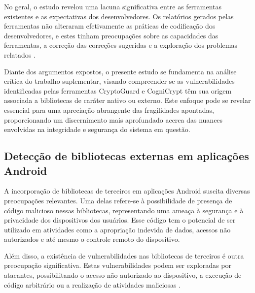 No geral, o estudo revelou uma lacuna significativa entre as ferramentas existentes e as expectativas dos desenvolvedores. Os relatórios gerados pelas ferramentas não alteraram efetivamente as práticas de codificação dos desenvolvedores, e estes tinham preocupações sobre as capacidades das ferramentas, a correção das correções sugeridas e a exploração dos problemas relatados \cite{api_misuses_zhang}.


Diante dos argumentos expostos, o presente estudo se fundamenta na análise crítica do trabalho suplementar, visando compreender se as vulnerabilidades identificadas pelas ferramentas CryptoGuard e CogniCrypt têm sua origem associada a bibliotecas de caráter nativo ou externo. Este enfoque pode se revelar essencial para uma apreciação abrangente das fragilidades apontadas, proporcionando um discernimento mais aprofundado acerca das nuances envolvidas na integridade e segurança do sistema em questão.

\subsection{Detecção de bibliotecas externas em aplicações Android} %

A incorporação de bibliotecas de terceiros em aplicações Android suscita diversas preocupações relevantes. Uma delas refere-se à possibilidade de presença de código malicioso nessas bibliotecas, representando uma ameaça à segurança e à privacidade dos dispositivos dos usuários. Esse código tem o potencial de ser utilizado em atividades como a apropriação indevida de dados, acessos não autorizados e até mesmo o controle remoto do dispositivo. \cite{api_tpl_zhang}

Além disso, a existência de vulnerabilidades nas bibliotecas de terceiros é outra preocupação significativa. Estas vulnerabilidades podem ser exploradas por atacantes, possibilitando o acesso não autorizado ao dispositivo, a execução de código arbitrário ou a realização de atividades maliciosas \cite{api_tpl_zhang}.

